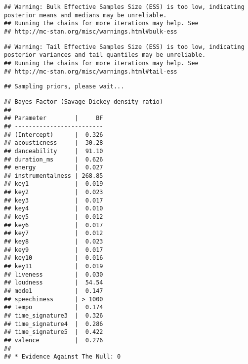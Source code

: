\documentclass[
]{article}
\begin{document}
\begin{verbatim}
## Warning: Bulk Effective Samples Size (ESS) is too low, indicating posterior means and medians may be unreliable.
## Running the chains for more iterations may help. See
## http://mc-stan.org/misc/warnings.html#bulk-ess
\end{verbatim}

\begin{verbatim}
## Warning: Tail Effective Samples Size (ESS) is too low, indicating posterior variances and tail quantiles may be unreliable.
## Running the chains for more iterations may help. See
## http://mc-stan.org/misc/warnings.html#tail-ess
\end{verbatim}

\begin{verbatim}
## Sampling priors, please wait...
\end{verbatim}

\begin{verbatim}
## Bayes Factor (Savage-Dickey density ratio)
## 
## Parameter        |     BF
## -------------------------
## (Intercept)      |  0.326
## acousticness     |  30.28
## danceability     |  91.10
## duration_ms      |  0.626
## energy           |  0.027
## instrumentalness | 268.85
## key1             |  0.019
## key2             |  0.023
## key3             |  0.017
## key4             |  0.010
## key5             |  0.012
## key6             |  0.017
## key7             |  0.012
## key8             |  0.023
## key9             |  0.017
## key10            |  0.016
## key11            |  0.019
## liveness         |  0.030
## loudness         |  54.54
## mode1            |  0.147
## speechiness      | > 1000
## tempo            |  0.174
## time_signature3  |  0.326
## time_signature4  |  0.286
## time_signature5  |  0.422
## valence          |  0.276
## 
## * Evidence Against The Null: 0
\end{verbatim}
\end{document}
